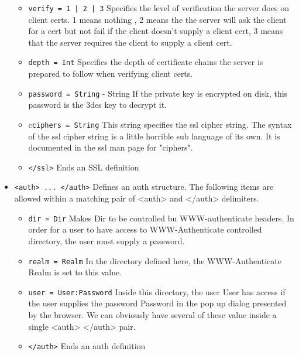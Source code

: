\documentclass[11pt,oneside,english]{book}
\begin{document}
\begin{itemize}
\begin{itemize}
\item        \verb+verify = 1 | 2 | 3+
              Specifies  the  level  of  verification  the
              server  does  on client certs. 1 means nothing
              , 2 means the the  server  will  ask  the
              client for a cert but not fail if the client
              doesn't supply a client cert, 3  means  that
              the  server  requires the client to supply a
              client cert.

\item        \verb+depth = Int+
              Specifies the depth  of  certificate  chains
              the  server is prepared to follow when verifying
              client certs.

\item        \verb+password = String+ -
              String If the private key  is  encrypted  on
              disk,  this  password  is  the  3des  key to
              decrypt it.

\item        c\verb+ciphers = String+
              This  string  specifies  the  ssl  cipher
              string.  The syntax of the ssl cipher string
              is a little horrible sub language of its own.
              It  is  documented  in  the ssl man page for
              "ciphers".

\item        \verb+</ssl>+
              Ends an SSL definition
\end{itemize}


\item       \verb+<auth> ... </auth>+
              Defines an  auth  structure.  The  following
              items  are allowed within a matching pair of
              <auth> and </auth> delimiters.

\begin{itemize}

\item       \verb+dir = Dir+
              Makes Dir to be controlled bu  WWW-authenticate
              headers.  In  order for a user to have
              access to WWW-Authenticate controlled  directory,
              the user must supply a password.

\item       \verb+realm = Realm+
              In  the  directory  defined  here,  the WWW-Authenticate
              Realm is set to this value.

\item       \verb+user = User:Password+
              Inside this directory,  the  user  User  has
              access  if  the  user  supplies the password
              Password in the pop up dialog presented  by
              the  browser.  We can obviously have several
              of  these  value  inside  a  single   <auth>
              </auth> pair.

\item       \verb+</auth>+
              Ends an auth definition


\end{itemize}

\end{itemize}
\end{document}
